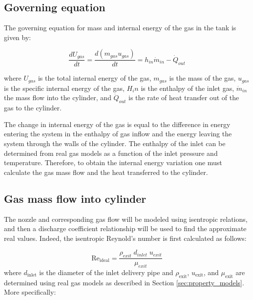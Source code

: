 


\subsection{Governing equation}


The governing equation for mass and internal energy of the gas in the tank is given by:

\begin{equation}
\frac{dU_{gas}}{dt} = \frac{d\left(m_{gas}u_{gas}\right)}{dt} = h_{in}\dot m_{in} - \dot Q_{out}
\end{equation}


\noindent where $U_{gas}$ is the total internal energy of the gas, $m_{gas}$ is the mass of the gas, $u_{gas}$ is the specific internal energy of the gas, $H_in$ is the enthalpy of the inlet gas, $\dot m_{in}$ the mass flow into the cylinder, and $\dot Q_{out}$ is the rate of heat transfer out of the gas to the cylinder.

The change in internal energy of the gas is equal to the difference in energy entering the system in the enthalpy of gas inflow and the energy leaving the system through the walls of the cylinder. The enthalpy of the inlet can be determined from real gas models as a function of the inlet pressure and temperature. Therefore, to obtain the internal energy variation one must calculate the gas mass flow and the heat transferred to the cylinder.



\subsection{Gas mass flow into cylinder}

The nozzle and corresponding gas flow will be modeled using isentropic relations, and then a discharge coefficient relationship will be used to find the approximate real values. Indeed, the isentropic Reynold's number is first calculated as follows:

\begin{equation}
\label{equ:reynoldsIdeal}
\text{Re}_{\text{ideal}} = \frac{\rho_{exit}\;d_{inlet}\;u_{exit}}{\mu_{exit}}
\end{equation}
where $d_{\text{inlet}}$ is the diameter of the inlet delivery pipe and  $\rho_{\text{exit}}$, $u_{\text{exit}}$, and $\mu_{\text{exit}}$ are determined using real gas models as described in Section \ref{sec:property_models}. More specifically:

